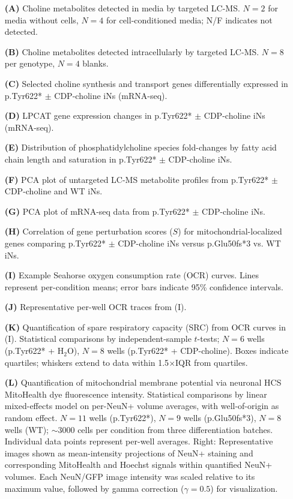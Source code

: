 \begin{itemize}
    \item[\textbf{(A)}] Choline metabolites detected in media by targeted LC-MS. $N=2$ for media without cells, $N=4$ for cell-conditioned media; N/F indicates not detected.
    \item[\textbf{(B)}] Choline metabolites detected intracellularly by targeted LC-MS. $N=8$ per genotype, $N=4$ blanks.
    \item[\textbf{(C)}] Selected choline synthesis and transport genes differentially expressed in p.Tyr622* $\pm$ CDP-choline iNs (mRNA-seq).
    \item[\textbf{(D)}] LPCAT gene expression changes in p.Tyr622* $\pm$ CDP-choline iNs (mRNA-seq).
    \item[\textbf{(E)}] Distribution of phosphatidylcholine species fold-changes by fatty acid chain length and saturation in p.Tyr622* $\pm$ CDP-choline iNs.
    \item[\textbf{(F)}] PCA plot of untargeted LC-MS metabolite profiles from p.Tyr622* $\pm$ CDP-choline and WT iNs.
    \item[\textbf{(G)}] PCA plot of mRNA-seq data from p.Tyr622* $\pm$ CDP-choline iNs.
    \item[\textbf{(H)}] Correlation of gene perturbation scores ($S$) for mitochondrial-localized genes comparing p.Tyr622* $\pm$ CDP-choline iNs versus p.Glu50fs*3 vs. WT iNs.
    \item[\textbf{(I)}] Example Seahorse oxygen consumption rate (OCR) curves. Lines represent per-condition means; error bars indicate 95\% confidence intervals.
    \item[\textbf{(J)}] Representative per-well OCR traces from (I).
    \item[\textbf{(K)}] Quantification of spare respiratory capacity (SRC) from OCR curves in (I). Statistical comparisons by independent-sample $t$-tests; $N=6$ wells (p.Tyr622* + H$_2$O), $N=8$ wells (p.Tyr622* + CDP-choline). Boxes indicate quartiles; whiskers extend to data within 1.5$\times$IQR from quartiles.
    \item[\textbf{(L)}] Quantification of mitochondrial membrane potential via neuronal HCS MitoHealth dye fluorescence intensity. Statistical comparisons by linear mixed-effects model on per-NeuN+ volume averages, with well-of-origin as random effect. $N=11$ wells (p.Tyr622*), $N=9$ wells (p.Glu50fs*3), $N=8$ wells (WT); $\sim3000$ cells per condition from three differentiation batches. Individual data points represent per-well averages. Right: Representative images shown as mean-intensity projections of NeuN+ staining and corresponding MitoHealth and Hoechst signals within quantified NeuN+ volumes. Each NeuN/GFP image intensity was scaled relative to its maximum value, followed by gamma correction ($\gamma = 0.5$) for visualization.
\end{itemize}